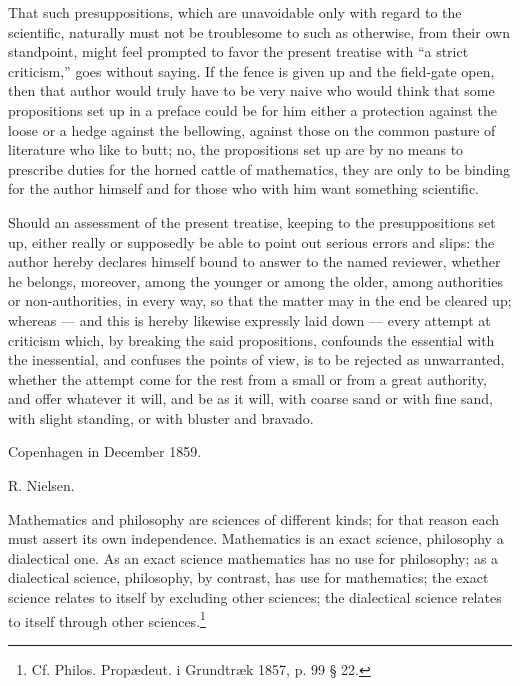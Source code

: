 \documentclass[12pt,a4paper,openany]{book}
\newcommand{\opage}[1]{\marginnote{\footnotesize\textit{[#1]}}}
\begin{document}
That such presuppositions, which are unavoidable only with regard to
the scientific, naturally must not be
troublesome to such as otherwise, from their own standpoint,
might feel prompted to favor the present
\opage{VII}treatise with ``a strict criticism,'' goes without saying. If the fence is given up and the field-gate open,
then that author would truly have to be very naive who would
think that some propositions set up in a preface could
be for him either a protection against the loose or a hedge against the
bellowing, against those on the common pasture of literature who like
to butt; no, the propositions set up are by no means to prescribe
duties for the horned cattle of mathematics, they are only to
be binding for the author himself and for those who with
him want something scientific.

Should an assessment of the present treatise,
keeping to the presuppositions set up, either
really or supposedly be able to point out serious errors
and slips: the author hereby declares himself bound to
answer to the named reviewer, whether he belongs, moreover,
among the younger or among the older, among authorities or
non-authorities, in every way, so that the matter
may in the end be cleared up; whereas --- and this is
hereby likewise expressly laid down --- every attempt at
criticism which, by breaking the said propositions,
confounds the essential with the inessential, and confuses the points of view,
is to be rejected as unwarranted, whether the attempt come for
the rest from a small or from a great authority, and offer whatever
it will, and be as it will, with coarse sand or with
fine sand, with slight standing, or with bluster and bravado.

\begin{flushleft}\hspace*{2em}Copenhagen in December 1859.\end{flushleft}
\begin{flushright}R. Nielsen.\end{flushright}

\clearpage

\setcounter{footnote}{0}%
\opage{3}Mathematics and philosophy are sciences of different kinds;
for that reason each must assert its own independence. Mathematics
is an exact science, philosophy a dialectical one.
As an exact science mathematics has no use for
philosophy; as a dialectical science, philosophy, by contrast, has
use for mathematics; the exact science relates
to itself by excluding other sciences;
the dialectical science relates to itself through other sciences.\footnote[1]{Cf. Philos. Propædeut. i Grundtræk 1857, p. 99 § 22.}
\end{document}
